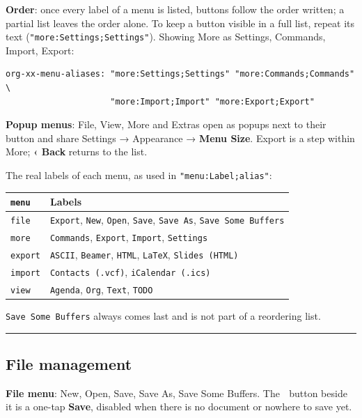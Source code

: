 \documentclass[11pt]{article}
\begin{document}
\textbf{Order}: once every label of a menu is listed, buttons follow the order written; a partial list leaves the order alone. To keep a button visible in a full list, repeat its text (\texttt{"more:Settings;Settings"}). Showing More as Settings, Commands, Import, Export:

\begin{verbatim}
org-xx-menu-aliases: "more:Settings;Settings" "more:Commands;Commands" \
                     "more:Import;Import" "more:Export;Export"
\end{verbatim}

\textbf{Popup menus}: File, View, More and Extras open as popups next to their button and share Settings → Appearance → \textbf{Menu Size}. Export is a step within More; \textbf{‹ Back} returns to the list.

The real labels of each menu, as used in \texttt{"menu:Label;alias"}:

\begin{center}
\begin{tabular}{ll}
\texttt{menu} & Labels\\[0pt]
\hline
\texttt{file} & \texttt{Export}, \texttt{New}, \texttt{Open}, \texttt{Save}, \texttt{Save As}, \texttt{Save Some Buffers}\\[0pt]
\texttt{more} & \texttt{Commands}, \texttt{Export}, \texttt{Import}, \texttt{Settings}\\[0pt]
\texttt{export} & \texttt{ASCII}, \texttt{Beamer}, \texttt{HTML}, \texttt{LaTeX}, \texttt{Slides (HTML)}\\[0pt]
\texttt{import} & \texttt{Contacts (.vcf)}, \texttt{iCalendar (.ics)}\\[0pt]
\texttt{view} & \texttt{Agenda}, \texttt{Org}, \texttt{Text}, \texttt{TODO}\\[0pt]
\end{tabular}
\end{center}

\texttt{Save Some Buffers} always comes last and is not part of a reordering list.

\noindent\rule{\textwidth}{0.5pt}

\subsection{File management}
\label{sec:orgc48c2f3}
\textbf{File menu}: New, Open, Save, Save As, Save Some Buffers. The 💾 button beside it is a one-tap \textbf{Save}, disabled when there is no document or nowhere to save yet.
\end{document}
